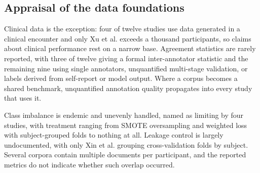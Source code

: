 \documentclass[11pt]{article}
\begin{document}
	\subsection{Appraisal of the data foundations}
	
	Clinical data is the exception: four of twelve studies use data generated in a clinical encounter and only Xu et al.\cite{Xu2025.01.03.24318117} exceeds a thousand participants, so claims about clinical performance rest on a narrow base. Agreement statistics are rarely reported, with three of twelve giving a formal inter-annotator statistic and the remaining nine using single annotators, unquantified multi-stage validation, or labels derived from self-report or model output. Where a corpus becomes a shared benchmark, unquantified annotation quality propagates into every study that uses it.
	
	Class imbalance is endemic and unevenly handled, named as limiting by four studies, with treatment ranging from SMOTE oversampling and weighted loss with subject-grouped folds to nothing at all. Leakage control is largely undocumented, with only Xin et al. grouping cross-validation folds by subject. Several corpora contain multiple documents per participant, and the reported metrics do not indicate whether such overlap occurred.
	
\end{document}
